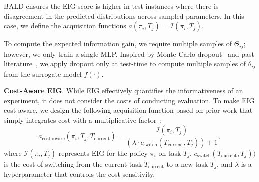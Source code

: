 BALD ensures the EIG score is higher in test instances where there is disagreement in the predicted distributions across sampled parameters.
In this case, we define the acquisition functions $a(\pi_i,T_j)=\mathcal{I}(\pi_i,T_j)$.



To compute the expected information gain, we require multiple samples of $\Theta_{ij}$; however, we only train a single MLP.
Inspired by Monte Carlo dropout~\cite{gal2016dropout} and past literature~\cite{loquercio2020general,ledda2023dropout}, we apply dropout only at test-time to compute multiple samples of $\theta_{ij}$ from the surrogate model $f(\cdot)$.





\textbf{Cost-Aware EIG}.
While EIG effectively quantifies the informativeness of an experiment, it does not consider the costs of conducting evaluation.
To make EIG cost-aware, we design the following acquisition function based on prior work that simply integrates cost with a multiplicative factor~\cite{paria2020cost,lee2020cost}:
\begin{equation}
    a_{\text{cost-aware}}(\pi_i, T_j, T_\text{current}) = \dfrac{\mathcal{I}(\pi_i, T_j)}{(\lambda \cdot c_{\text{switch}}(T_{\text{current}}, T_j))+1},
    \label{eq:cost_aware_eig}
\end{equation}
where $\mathcal{I}(\pi_i, T_j)$ represents EIG for the policy $\pi_i$ on task $T_j$, $c_{\text{switch}}(T_{\text{current}}, T_j))$ is the cost of switching from the current task $T_{\text{current}}$ to a new task $T_j$, and $\lambda$ is a hyperparameter that controls the cost sensitivity.

